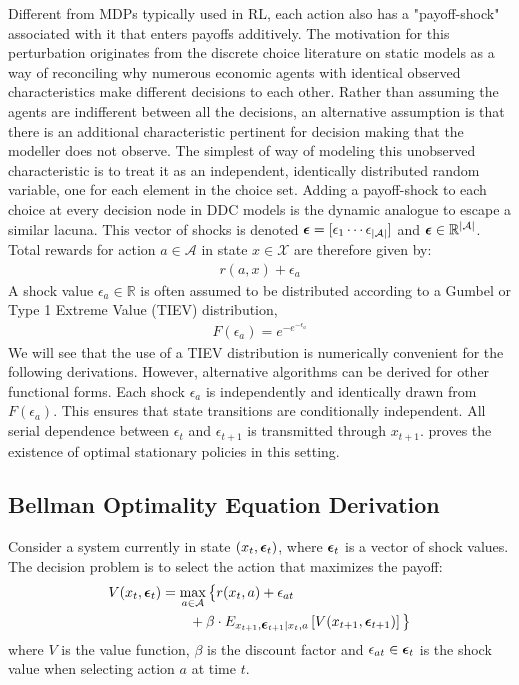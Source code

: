 \documentclass{article}
\renewcommand{\vec}[1]{\mbox{\bm{$#1$}}}
\begin{document}
Different from MDPs typically used in RL, each action also has a "payoff-shock" associated with it that enters payoffs additively.
The motivation for this perturbation originates from the discrete choice literature \cite{mcfadden1973conditional} on static models as a way of reconciling why numerous economic agents with identical observed characteristics make different decisions to each other. Rather than assuming the agents are indifferent between all the decisions,
an alternative assumption is that there is an additional characteristic pertinent for decision making that the modeller does not observe. The simplest of way of modeling this unobserved characteristic is to treat it as an independent, identically distributed random variable, one for each element in the choice set. Adding a payoff-shock to each choice at every decision node in DDC models is the dynamic analogue to escape a similar lacuna.
This vector of shocks is denoted $\vec{\epsilon} = [ \epsilon_{1} \cdots \epsilon_{|\mathcal{A}|} ]$ and $\vec{\epsilon}\in \mathbb{R}^{|\mathcal{A}|}$. Total rewards for action $a \in \mathcal{A}$ in state $x \in \mathcal{X}$ are therefore given by:
\begin{eqnarray}
r(a,x)+\epsilon_a
\end{eqnarray}
A shock value $\epsilon_a\in\mathbb{R}$ is often assumed to be distributed according to a Gumbel or Type 1 Extreme Value (TIEV) distribution,
\begin{align}
F(\epsilon_a)=e^{-e^{-\epsilon_a}}
\end{align}
We will see that the use of a TIEV distribution is numerically convenient for the following derivations. However, alternative algorithms can be derived for other functional forms. Each shock $\epsilon_a$ is independently and identically drawn from $F(\epsilon_a)$. This ensures that state transitions are conditionally independent. All serial dependence between $\epsilon_{t}$ and $\epsilon_{t+1}$ is transmitted through $x_{t+1}$. \cite{rust_theory} proves the existence of optimal stationary policies in this setting.

\subsection{Bellman Optimality Equation Derivation}

Consider a system currently in state $(x_t,\vec{\epsilon}_t)$, where $\vec{\epsilon}_t$ is a vector of shock values. The decision problem is to select the action that maximizes the payoff:
\begin{align}
\begin{split}
V(x_t,\vec{\epsilon}_t) & = \max_{a\in\mathcal{A}} \big\{r(x_t,a)+\epsilon_{at} \\
& \qquad + \beta \cdot E_{x_{t+1},\vec{\epsilon}_{t+1}|x_t,a} \left[V(x_{t+1},\vec{\epsilon}_{t+1})\right] \big\} \\
\end{split}
\end{align} 
where $V$ is the value function, $\beta$ is the discount factor and $\epsilon_{at} \in \vec{\epsilon}_t$ is the shock value when selecting action $a$ at time $t$.
\end{document}
